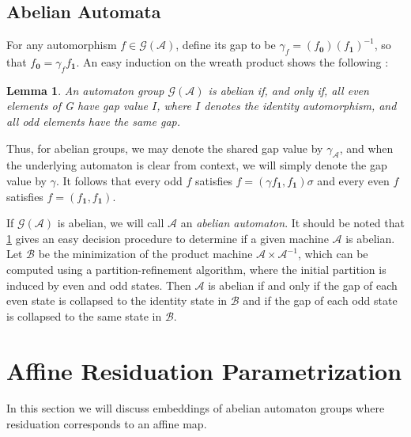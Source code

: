 \documentclass[12pt, letterpaper]{article}
\newcommand{\A}{\mathcal A}
\newcommand{\ch}[1]{\mathbf{#1}}
\newcommand{\res}[2]{{{#1}_{\ch{#2}}}}
\newcommand{\gp}{\mathcal G}
\newtheorem{lemma}[thm]{Lemma}
\begin{document}
\subsection{Abelian Automata} \label{sec:abelian-automata}
For any automorphism $f \in \gp(\A)$, define its gap to be $\gamma_f =
(\res{f}{0})(\res{f}{1})^{-1}$, so that $\res{f}{0} = \gamma_f \res{f}{1}$. An
easy induction on the wreath product shows the following \cite{Okano-Thesis}:
\begin{lemma}\label{lemma:gap}
    An automaton group $\gp(\A)$ is abelian if, and only if, all even elements
    of G have gap value $I$, where $I$ denotes the identity automorphism, and
    all odd elements have the same gap.
\end{lemma}
Thus, for abelian groups, we may denote the shared gap value by $\gamma_\A$,
and when the underlying automaton is clear from context, we will simply denote
the gap value by $\gamma$.  It follows that every odd $f$ satisfies $f =
(\gamma \res{f}{1}, \res{f}{1})\sigma$ and every even $f$ satisfies $f =
(\res{f}{1}, \res{f}{1})$.

If $\gp(\A)$ is abelian, we will call $\A$ an \emph{abelian automaton}. It
should be noted that \cref{lemma:gap} gives an easy decision procedure to
determine if a given machine $\A$ is abelian. Let $\mathcal B$ be the
minimization of the product machine $\A \times \A^{-1}$, which can be computed
using a partition-refinement algorithm, where the initial partition is induced
by even and odd states. Then $\A$ is abelian if and only if the gap of each
even state is collapsed to the identity state in $\mathcal B$ and if the gap of
each odd state is collapsed to the same state in $\mathcal B$.

\section{Affine Residuation Parametrization}\label{sec:alg-num-theory}
In this section we will discuss embeddings of abelian automaton groups where
residuation corresponds to an affine map.
\end{document}
